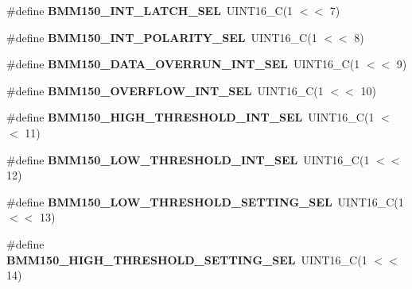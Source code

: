 \begin{DoxyCompactItemize}
\#define {\bfseries B\+M\+M150\+\_\+\+I\+N\+T\+\_\+\+L\+A\+T\+C\+H\+\_\+\+S\+EL}~U\+I\+N\+T16\+\_\+C(1 $<$$<$ 7)
\item 
\mbox{\label{group___b_m_m150_ga42d80018b6fbba8660ec651f4bff3a68}} 
\#define {\bfseries B\+M\+M150\+\_\+\+I\+N\+T\+\_\+\+P\+O\+L\+A\+R\+I\+T\+Y\+\_\+\+S\+EL}~U\+I\+N\+T16\+\_\+C(1 $<$$<$ 8)
\item 
\mbox{\label{group___b_m_m150_ga027182e11bafb47085f223dc3092088a}} 
\#define {\bfseries B\+M\+M150\+\_\+\+D\+A\+T\+A\+\_\+\+O\+V\+E\+R\+R\+U\+N\+\_\+\+I\+N\+T\+\_\+\+S\+EL}~U\+I\+N\+T16\+\_\+C(1 $<$$<$ 9)
\item 
\mbox{\label{group___b_m_m150_gafc6359bc656da3823dbbb0d67bf37c4b}} 
\#define {\bfseries B\+M\+M150\+\_\+\+O\+V\+E\+R\+F\+L\+O\+W\+\_\+\+I\+N\+T\+\_\+\+S\+EL}~U\+I\+N\+T16\+\_\+C(1 $<$$<$ 10)
\item 
\mbox{\label{group___b_m_m150_ga1ddcd00f6d852367029a73faed433075}} 
\#define {\bfseries B\+M\+M150\+\_\+\+H\+I\+G\+H\+\_\+\+T\+H\+R\+E\+S\+H\+O\+L\+D\+\_\+\+I\+N\+T\+\_\+\+S\+EL}~U\+I\+N\+T16\+\_\+C(1 $<$$<$ 11)
\item 
\mbox{\label{group___b_m_m150_gaadddd8d5c6a55cd7f76497ca2c8a8d4a}} 
\#define {\bfseries B\+M\+M150\+\_\+\+L\+O\+W\+\_\+\+T\+H\+R\+E\+S\+H\+O\+L\+D\+\_\+\+I\+N\+T\+\_\+\+S\+EL}~U\+I\+N\+T16\+\_\+C(1 $<$$<$ 12)
\item 
\mbox{\label{group___b_m_m150_ga92295b9050f0ab7c77f997374a224a6d}} 
\#define {\bfseries B\+M\+M150\+\_\+\+L\+O\+W\+\_\+\+T\+H\+R\+E\+S\+H\+O\+L\+D\+\_\+\+S\+E\+T\+T\+I\+N\+G\+\_\+\+S\+EL}~U\+I\+N\+T16\+\_\+C(1 $<$$<$ 13)
\item 
\mbox{\label{group___b_m_m150_gafe347f30221ea77ea52121b65f30f63a}} 
\#define {\bfseries B\+M\+M150\+\_\+\+H\+I\+G\+H\+\_\+\+T\+H\+R\+E\+S\+H\+O\+L\+D\+\_\+\+S\+E\+T\+T\+I\+N\+G\+\_\+\+S\+EL}~U\+I\+N\+T16\+\_\+C(1 $<$$<$ 14)
\end{DoxyCompactItemize}
